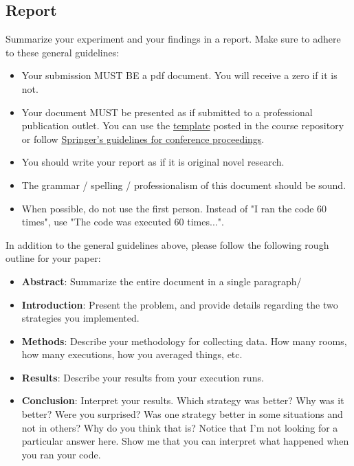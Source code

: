 \documentclass[paper=a4, fontsize=11pt, parskip=full]{scrartcl} %
\numberwithin{equation}{section} %
\numberwithin{figure}{section} %
\numberwithin{table}{section} %
\begin{document}
\subsection{Report}

Summarize your experiment and your findings in a report. Make sure to adhere to these general guidelines:

\begin{itemize}
	\item Your submission MUST BE a pdf document. You will receive a zero if it is not.
	\item Your document MUST be presented as if submitted to a professional publication outlet. You can use the \href{https://github.com/markfloryan/dsa1}{template} posted in the course repository or follow \href{https://www.springer.com/us/computer-science/lncs/conference-proceedings-guidelines}{Springer's guidelines for conference proceedings}.
	\item You should write your report as if it is original novel research.
	\item The grammar / spelling / professionalism of this document should be sound.
	\item When possible, do not use the first person. Instead of "I ran the code 60 times", use "The code was executed 60 times...".
\end{itemize}

In addition to the general guidelines above, please follow the following rough outline for your paper:

\begin{itemize}
	\item \textbf{Abstract}: Summarize the entire document in a single paragraph/
	\item \textbf{Introduction}: Present the problem, and provide details regarding the two strategies you implemented.
	\item \textbf{Methods}: Describe your methodology for collecting data. How many rooms, how many executions, how you averaged things, etc.
	\item \textbf{Results}: Describe your results from your execution runs.
	\item \textbf{Conclusion}: Interpret your results. Which strategy was better? Why was it better? Were you surprised? Was one strategy better in some situations and not in others? Why do you think that is? Notice that I'm not looking for a particular answer here. Show me that you can interpret what happened when you ran your code.
\end{itemize}
\end{document}
